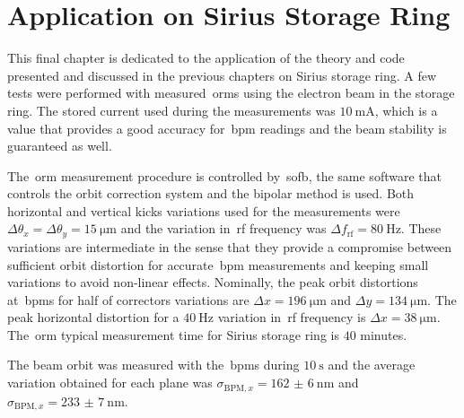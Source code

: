 \chapter{Application on Sirius Storage Ring}

This final chapter is dedicated to the application of the theory and code presented and discussed in the previous chapters on Sirius storage ring. A few tests were performed with measured~\glspl{orm} using the electron beam in the storage ring. The stored current used during the measurements was $\SI{10}{\milli\ampere}$, which is a value that provides a good accuracy for~\gls{bpm} readings and the beam stability is guaranteed as well.

The~\gls{orm} measurement procedure is controlled by~\gls{sofb}, the same software that controls the orbit correction system and the bipolar method is used. Both horizontal and vertical kicks variations used for the measurements were $\Delta \theta_x = \Delta \theta_y = \SI{15}{\micro\meter}$ and the variation in~\gls{rf} frequency was $\Delta f_{\mathrm{rf}} = \SI{80}{\hertz}$. These variations are intermediate in the sense that they provide a compromise between sufficient orbit distortion for accurate~\gls{bpm} measurements and keeping small variations to avoid non-linear effects. Nominally, the peak orbit distortions at~\glspl{bpm} for half of correctors variations are $\Delta x = \SI{196}{\micro\meter}$ and $\Delta y = \SI{134}{\micro\meter}$. The peak horizontal distortion for a $\SI{40}{\hertz}$ variation in~\gls{rf} frequency is $\Delta x = \SI{38}{\micro\meter}$. The~\gls{orm} typical measurement time for Sirius storage ring is $40$ minutes.

The beam orbit was measured  with the~\glspl{bpm} during $\SI{10}{\second}$ and the average variation obtained for each plane was $\sigma_{\mathrm{BPM}, x} = \SI{162(6)}{\nano\meter}$ and $\sigma_{\mathrm{BPM}, x} = \SI{233(7)}{\nano\meter}$.


